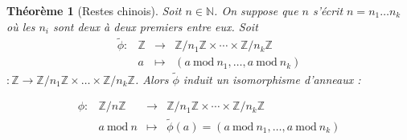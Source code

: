 \documentclass[12pt]{report}
\newtheorem{thm}{Théorème}[chapter]
\newcommand{\N}{\mathbb{N}}
\newcommand{\Z}{\mathbb{Z}}
\begin{document}
\begin{thm}[Restes chinois]\label{thmChinois}
Soit $n\in \N$. On suppose que $n$ s'écrit $n=n_1 \ldots n_k$ où les $n_i$ sont deux à deux premiers entre eux. Soit \begin{equation*}
\begin{array}{cccc}
\tilde{\phi} : &  \mathbb{Z}&   \longrightarrow & \mathbb{Z}/n_1 \mathbb{Z} \times \cdots   \times \mathbb{Z}/n_k \mathbb{Z}  \\
            & a &  \longmapsto  & (a \mathrm{ \ mod\ } n_1,  \ldots , a \mathrm{\ mod\ } n_k) 
\end{array}
\end{equation*}$ :\Z\rightarrow \Z/n_1\Z\times \ldots \times \Z/n_k \Z$. Alors $\tilde{\phi}$ induit un isomorphisme d'anneaux :

\begin{equation*}
\begin{array}{cccc}
\phi : &  \mathbb{Z}/n \mathbb{Z}  &   \longrightarrow & \mathbb{Z}/n_1 \mathbb{Z} \times \cdots   \times \mathbb{Z}/n_k \mathbb{Z}  \\
            & a\mathrm{\ mod\ }n &  \longmapsto  &  \tilde{\phi}(a)=(a \mathrm{\ mod\ } n_1,  \ldots , a \mathrm{\ mod\ } n_k) 
\end{array}
\end{equation*}


\end{thm}
\end{document}
